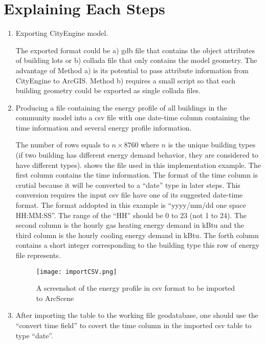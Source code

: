 \section{Explaining Each Steps}
\begin{enumerate}[1)]
\item Exporting CityEngine model. 

  The exported format could be a) gdb file that contains the object
  attributes of building lots or b) collada file that only contains
  the model geometry. The advantage of Method a) is its potential to
  pass attribute information from CityEngine to ArcGIS. Method b)
  requires a small script so that each building geometry could be
  exported as single collada files.

\item Producing a file containing the energy profile of all buildings
  in the community model into a csv file with one date-time column
  containing the time information and several energy profile
  information.

  The number of rows equals to $n \times 8760$ where $n$ is the unique
  building types (if two building has different energy demand
  behavior, they are considered to have different types).
   shows the file used in this implementation
  example. The first column contains the time information. The format
  of the time column is crutial because it will be converted to a
  ``date'' type in later steps. This conversion requires the input csv
  file have one of its suggested date-time format. The format addopted
  in this example is ``yyyy/mm/dd one space HH:MM:SS''. The range of
  the ``HH'' should be 0 to 23 (not 1 to 24). The second column is the
  hourly gas heating energy demand in kBtu and the third column is the
  hourly cooling energy demand in kBtu. The forth column contains a
  short integer corresponding to the building type this row of energy
  file represents.

\begin{figure}[h!]
  \centering
  \texttt{[image: importCSV.png]}
  \caption[Imported CSV]{A screenshot of the energy profile in csv
    format to be imported to ArcScene}
  \label{fig:importCSV}
\end{figure}

\item After importing the table to the working file geodatabase, one
  should use the ``convert time field'' to covert the time column in
  the imported csv table to type ``date''.


\end{enumerate}
